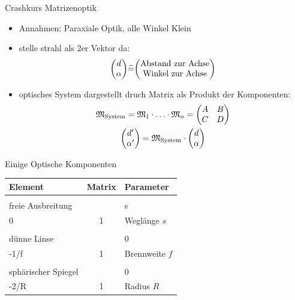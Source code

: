 \documentclass[10pt, aspectratio=169]{beamer}
\begin{document}
\begin{frame}{Crashkurs Matrizenoptik}
  \begin{itemize}
  \item<1-> Annahmen: Paraxiale Optik, alle Winkel Klein
  \item<2-> stelle strahl als 2er Vektor da:
    \begin{equation}
      \mqty(d \\ \alpha) \widehat{=} \mqty(\text{Abstand zur Achse} \\
      \text{Winkel zur Achse})
    \end{equation}

  \item<3-> optisches System dargestellt druch Matrix als Produkt der
    Komponenten:
    \begin{gather}
      \label{eq:systmatrix}
      \mathfrak{M}_{\text{System}}=\mathfrak{M}_{\text{1}}\cdot\ldots\cdot\mathfrak{M}_{n}=\mqty(A
      & B \\ C & D) \\
      \mqty(d' \\ \alpha') = \mathfrak{M}_{\text{System}}\cdot\mqty(d
      \\ \alpha)
    \end{gather}
  \end{itemize}
\end{frame}
\begin{frame}{Einige Optische Komponenten}
  \begin{table}[h!]
    \begin{tabular}{l | c | l}
      \textbf{Element} & \textbf{Matrix} & \textbf{Parameter} \\
      \midrule\\
      \addlinespace[-2ex]
      freie Ausbreitung & \(\begin{pmatrix}
        1 & s \\
        0 & 1
      \end{pmatrix}\) & Wegl\"ange \(s\) \\
      \midrule\\
      \addlinespace[-2ex] d\"unne Linse & \(\begin{pmatrix}
        1 & 0 \\
        -1/f & 1
      \end{pmatrix}\) & Brennweite \(f\) \\
      \midrule\\
      \addlinespace[-2ex] sph\"arischer Spiegel & \(\begin{pmatrix}
        1 & 0 \\
        -2/R & 1
      \end{pmatrix}\) & Radius \(R\) \\

    \end{tabular}
  \end{table}
\end{frame}
\end{document}
